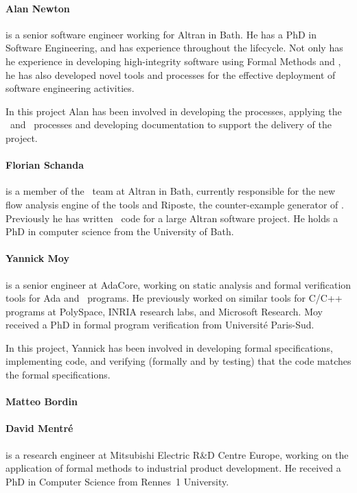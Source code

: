\paragraph{Alan Newton}
is a senior software engineer working for Altran in Bath. He has a PhD
in Software Engineering, and has experience throughout the
lifecycle. Not only has he experience in developing high-integrity
software using Formal Methods and \spark, he has also developed novel
tools and processes for the effective deployment of software
engineering activities.

In this project Alan has been involved in developing the processes,
applying the \reveal\ and \informed\ processes and developing
documentation to support the delivery of the project.

\paragraph{Florian Schanda}
is a member of the \spark\ team at Altran in Bath, currently
responsible for the new flow analysis engine of the  tools
and Riposte, the counter-example generator of \spark. Previously he
has written \spark\ code for a large Altran software project. He holds
a PhD in computer science from the University of Bath.


\paragraph{Yannick Moy}
is a senior engineer at AdaCore, working on static analysis and formal
verification tools for Ada and \spark\ programs. He previously worked
on similar tools for C/C++ programs at PolySpace, INRIA research labs,
and Microsoft Research. Moy received a PhD in formal program
verification from Universit\'e Paris-Sud.

In this project, Yannick has been involved in developing formal
specifications, implementing code, and verifying (formally and by testing)
that the code matches the formal specifications.

\paragraph{Matteo Bordin}

\paragraph{David Mentr\' e}
is a research engineer at Mitsubishi Electric R\&D Centre Europe,
working on the application of formal methods to industrial product
development. He received a PhD in Computer Science from Rennes~1
University.

